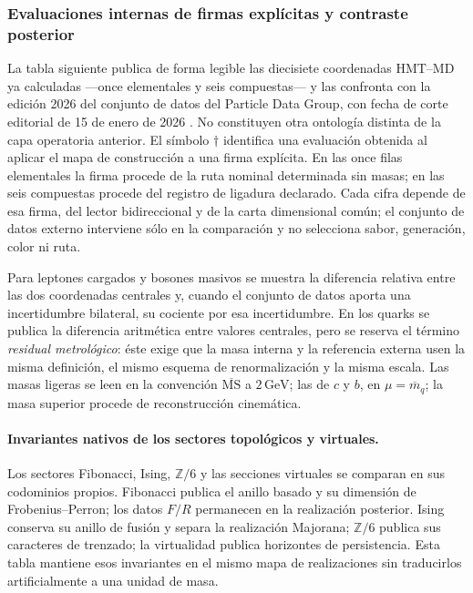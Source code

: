 
\subsubsection{Evaluaciones internas de firmas explícitas y contraste posterior}

La tabla siguiente publica de forma legible las diecisiete coordenadas HMT--MD ya
calculadas ---once elementales y seis compuestas--- y las confronta con la
edición 2026 del conjunto de datos del Particle Data Group, con fecha de corte
editorial de 15 de enero de 2026 \cite{PDG2026}. No constituyen otra ontología
distinta de la capa operatoria anterior. El símbolo \(\dagger\)
identifica una evaluación obtenida al aplicar el mapa de construcción a una firma
explícita. En las once filas elementales la firma procede de la ruta nominal
determinada sin masas; en las seis compuestas procede del registro de ligadura
declarado. Cada cifra depende de esa firma, del lector bidireccional y de la carta
dimensional común; el conjunto de datos externo interviene sólo en la comparación
y no selecciona sabor, generación, color ni ruta.

\enlargethispage{2\baselineskip}
Para leptones cargados y bosones masivos se muestra la diferencia relativa entre
las dos coordenadas centrales y, cuando el conjunto de datos aporta una incertidumbre
bilateral, su cociente por esa incertidumbre. En los quarks se publica la
diferencia aritmética entre valores centrales, pero se reserva el término
\emph{residual metrológico}: éste exige que la masa interna y la referencia externa
usen la misma definición, el mismo esquema de renormalización y la misma escala.
Las masas ligeras se leen en la convención \(\overline{\mathrm{MS}}\) a
\(2\,\mathrm{GeV}\); las de \(c\) y \(b\), en
\(\mu=\overline m_q\); la masa superior procede de reconstrucción cinemática.



\paragraph{Invariantes nativos de los sectores topológicos y virtuales.}
Los sectores Fibonacci, Ising, \(\mathbb Z/6\) y las secciones virtuales se comparan
en sus codominios propios. Fibonacci publica el anillo basado y su dimensión de
Frobenius--Perron; los datos \(F/R\) permanecen en la realización posterior. Ising
conserva su anillo de fusión y separa la realización Majorana; \(\mathbb Z/6\)
publica sus caracteres de trenzado; la virtualidad publica horizontes de
persistencia. Esta
tabla mantiene esos invariantes en el mismo mapa de realizaciones sin traducirlos
artificialmente a una unidad de masa.


